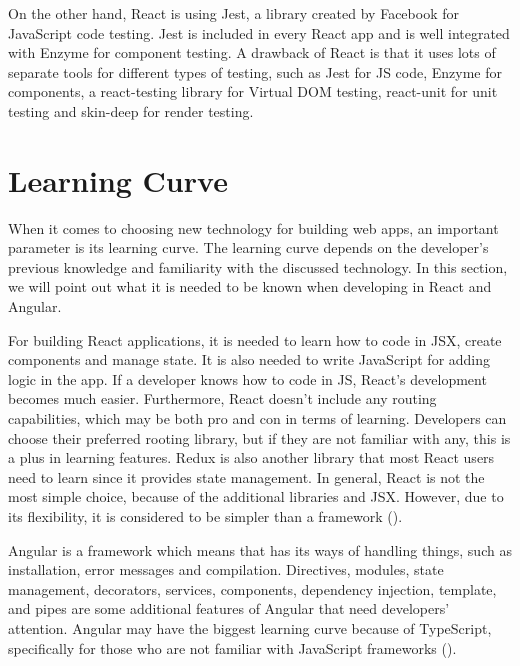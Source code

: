 On the other hand, React is using Jest, a library created by Facebook for JavaScript code testing. Jest is included in every React app and is well integrated with Enzyme for component testing. A drawback of React is that it uses lots of separate tools for different types of testing, such as Jest for JS code, Enzyme for components, a react-testing library for Virtual DOM testing, react-unit for unit testing and skin-deep for render testing. \par

\section{Learning Curve}

When it comes to choosing new technology for building web apps, an important parameter is its learning curve. The learning curve depends on the developer's previous knowledge and familiarity with the discussed technology. In this section, we will point out what it is needed to be known when developing in React and Angular. \par

For building React applications, it is needed to learn how to code in JSX, create components and manage state. It is also needed to write JavaScript for adding logic in the app. If a developer knows how to code in JS, React's development becomes much easier. Furthermore, React doesn't include any routing capabilities, which may be both pro and con in terms of learning. Developers can choose their preferred rooting library, but if they are not familiar with any, this is a plus in learning features. Redux is also another library that most React users need to learn since it provides state management. In general, React is not the most simple choice, because of the additional libraries and JSX. However, due to its flexibility, it is considered to be simpler than a framework (\cite{reactQuickly}). \par

Angular is a framework which means that has its ways of handling things, such as installation, error messages and compilation. Directives, modules, state management, decorators, services, components, dependency injection, template, and pipes are some additional features of Angular that need developers' attention. Angular may have the biggest learning curve because of TypeScript, specifically for those who are not familiar with JavaScript frameworks (\cite{Reference6}). \par

